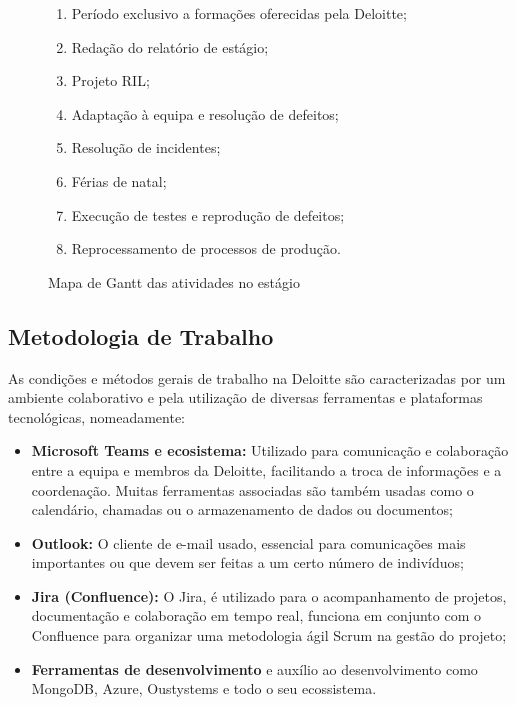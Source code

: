 \begin{figure}[htbp]
            \begin{enumerate}[nosep, label=\arabic*)]
                \item {} Período exclusivo a formações oferecidas pela Deloitte;
                \item {} Redação do relatório de estágio;
                \item {} Projeto RIL;
                \item {} Adaptação à equipa e resolução de defeitos;
                \item {} Resolução de incidentes;
                \item {} Férias de natal;
                \item {} Execução de testes e reprodução de defeitos;
                \item {} Reprocessamento de processos de produção.
            \end{enumerate}
            
            \caption{Mapa de Gantt das atividades no estágio}\label{mapadegantt}
        \end{figure}

    \subsection{Metodologia de Trabalho}\label{subsec:metodo-trabalho}

        As condições e métodos gerais de trabalho na Deloitte são caracterizadas por um ambiente colaborativo e pela utilização de diversas ferramentas e plataformas tecnológicas, nomeadamente:

        \begin{itemize}
            \item \textbf{Microsoft Teams e ecosistema:} Utilizado para comunicação e colaboração entre a equipa e membros da Deloitte, facilitando a troca de informações e a coordenação. Muitas ferramentas associadas são também usadas como o calendário, chamadas ou o armazenamento de dados ou documentos;
            \item \textbf{Outlook:} O cliente de e-mail usado, essencial para comunicações mais importantes ou que devem ser feitas a um certo número de indivíduos;
            \item \textbf{Jira (Confluence):} O Jira, é utilizado para o acompanhamento de projetos, documentação e colaboração em tempo real, funciona em conjunto com o Confluence para organizar uma metodologia ágil Scrum na gestão do projeto;
            \item \textbf{Ferramentas de desenvolvimento} e auxílio ao desenvolvimento como MongoDB, Azure, Oustystems e todo o seu ecossistema.
        \end{itemize}

